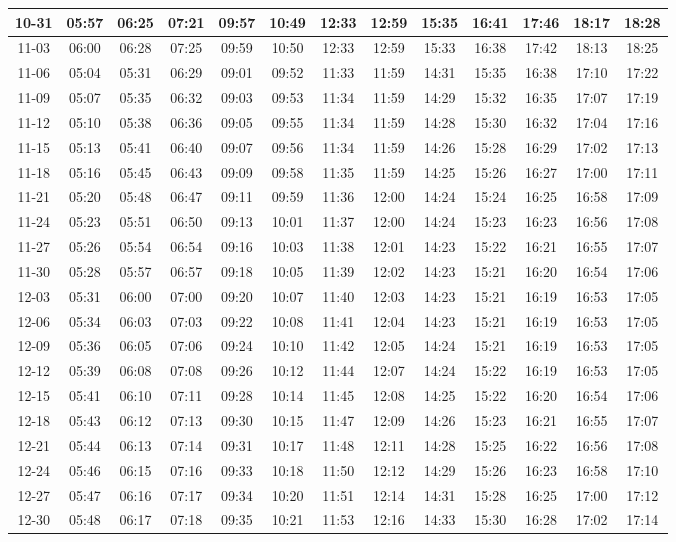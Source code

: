 \begin{footnotesize}
\begin{longtable}{c | c | c | c | c | c | c | c | c | c | c | c | c}
		10-31&05:57&06:25&07:21&09:57&10:49&12:33&12:59&15:35&16:41&17:46&18:17&18:28\\\hline
		11-03&06:00&06:28&07:25&09:59&10:50&12:33&12:59&15:33&16:38&17:42&18:13&18:25\\\hline
		11-06&05:04&05:31&06:29&09:01&09:52&11:33&11:59&14:31&15:35&16:38&17:10&17:22\\\hline
		11-09&05:07&05:35&06:32&09:03&09:53&11:34&11:59&14:29&15:32&16:35&17:07&17:19\\\hline
		11-12&05:10&05:38&06:36&09:05&09:55&11:34&11:59&14:28&15:30&16:32&17:04&17:16\\\hline
		11-15&05:13&05:41&06:40&09:07&09:56&11:34&11:59&14:26&15:28&16:29&17:02&17:13\\\hline
		11-18&05:16&05:45&06:43&09:09&09:58&11:35&11:59&14:25&15:26&16:27&17:00&17:11\\\hline
		11-21&05:20&05:48&06:47&09:11&09:59&11:36&12:00&14:24&15:24&16:25&16:58&17:09\\\hline
		11-24&05:23&05:51&06:50&09:13&10:01&11:37&12:00&14:24&15:23&16:23&16:56&17:08\\\hline
		11-27&05:26&05:54&06:54&09:16&10:03&11:38&12:01&14:23&15:22&16:21&16:55&17:07\\\hline
		11-30&05:28&05:57&06:57&09:18&10:05&11:39&12:02&14:23&15:21&16:20&16:54&17:06\\\hline
		12-03&05:31&06:00&07:00&09:20&10:07&11:40&12:03&14:23&15:21&16:19&16:53&17:05\\\hline
		12-06&05:34&06:03&07:03&09:22&10:08&11:41&12:04&14:23&15:21&16:19&16:53&17:05\\\hline
		12-09&05:36&06:05&07:06&09:24&10:10&11:42&12:05&14:24&15:21&16:19&16:53&17:05\\\hline
		12-12&05:39&06:08&07:08&09:26&10:12&11:44&12:07&14:24&15:22&16:19&16:53&17:05\\\hline
		12-15&05:41&06:10&07:11&09:28&10:14&11:45&12:08&14:25&15:22&16:20&16:54&17:06\\\hline
		12-18&05:43&06:12&07:13&09:30&10:15&11:47&12:09&14:26&15:23&16:21&16:55&17:07\\\hline
		12-21&05:44&06:13&07:14&09:31&10:17&11:48&12:11&14:28&15:25&16:22&16:56&17:08\\\hline
		12-24&05:46&06:15&07:16&09:33&10:18&11:50&12:12&14:29&15:26&16:23&16:58&17:10\\\hline
		12-27&05:47&06:16&07:17&09:34&10:20&11:51&12:14&14:31&15:28&16:25&17:00&17:12\\\hline
		12-30&05:48&06:17&07:18&09:35&10:21&11:53&12:16&14:33&15:30&16:28&17:02&17:14\\\hline
\end{longtable}\end{footnotesize}
